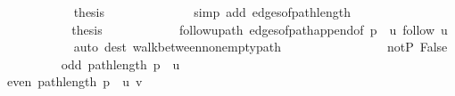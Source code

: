 \begin{isabellebody}
\ \ \ \ \ \ \ \ \ \ \isamarkupfalse%
\ {\isacharquery}{\kern0pt}thesis\isanewline
\ \ \ \ \ \ \ \ \ \ \ \ \isamarkupfalse%
\ {\isacharparenleft}{\kern0pt}simp\ add{\isacharcolon}{\kern0pt}\ edges{\isacharunderscore}{\kern0pt}of{\isacharunderscore}{\kern0pt}path{\isacharunderscore}{\kern0pt}length{\isacharparenright}{\kern0pt}\isanewline
\ \ \ \ \ \ \ \ \isamarkupfalse%
\isanewline
\ \ \ \ \ \ \ \ \isamarkupfalse%
\ \isamarkupfalse%
\ {\isacharquery}{\kern0pt}thesis\isanewline
\ \ \ \ \ \ \ \ \ \ \isamarkupfalse%
\ follow{\isacharunderscore}{\kern0pt}u{\isacharunderscore}{\kern0pt}path\ edges{\isacharunderscore}{\kern0pt}of{\isacharunderscore}{\kern0pt}path{\isacharunderscore}{\kern0pt}append{\isacharunderscore}{\kern0pt}{}{\isacharbrackleft}{\kern0pt}of\ {\isachardoublequoteopen}p\ {\isacharat}{\kern0pt}\ {\isacharbrackleft}{\kern0pt}u{\isacharbrackright}{\kern0pt}{\isachardoublequoteclose}\ {\isachardoublequoteopen}follow\ u{\isachardoublequoteclose}{\isacharbrackright}{\kern0pt}\isanewline
\ \ \ \ \ \ \ \ \ \ \isamarkupfalse%
\ {\isacharparenleft}{\kern0pt}auto\ dest{\isacharcolon}{\kern0pt}\ walk{\isacharunderscore}{\kern0pt}between{\isacharunderscore}{\kern0pt}nonempty{\isacharunderscore}{\kern0pt}path{\isacharparenleft}{\kern0pt}{}{\isacharparenright}{\kern0pt}{\isacharparenright}{\kern0pt}\isanewline
\ \ \ \ \ \ \isamarkupfalse%
\isanewline
\ \ \ \ \ \ \ \ \isamarkupfalse%
\ not{\isacharunderscore}{\kern0pt}P{\isacharprime}{\kern0pt}{\isacharprime}{\kern0pt}{\isacharcolon}{\kern0pt}\ False\isanewline
\ \ \ \ \ \ \ \ \isamarkupfalse%
\ {\isachardoublequoteopen}odd\ {\isacharparenleft}{\kern0pt}path{\isacharunderscore}{\kern0pt}length\ {\isacharparenleft}{\kern0pt}p\ {\isacharat}{\kern0pt}\ {\isacharbrackleft}{\kern0pt}u{\isacharbrackright}{\kern0pt}{\isacharparenright}{\kern0pt}{\isacharparenright}{\kern0pt}{\isachardoublequoteclose}\isanewline
\ \ \ \ \ \ \ \ \isamarkupfalse%
\ {\isacharminus}{\kern0pt}\isanewline
\ \ \ \ \ \ \ \ \ \ \isamarkupfalse%
\ {\isachardoublequoteopen}even\ {\isacharparenleft}{\kern0pt}path{\isacharunderscore}{\kern0pt}length\ {\isacharparenleft}{\kern0pt}p\ {\isacharat}{\kern0pt}\ {\isacharbrackleft}{\kern0pt}u{\isacharcomma}{\kern0pt}\ v{\isacharbrackright}{\kern0pt}{\isacharparenright}{\kern0pt}{\isacharparenright}{\kern0pt}{\isachardoublequoteclose}\isanewline
\ \ \ \ \ \ \ \ \ \ \ \ \isamarkupfalse%

\end{isabellebody}
